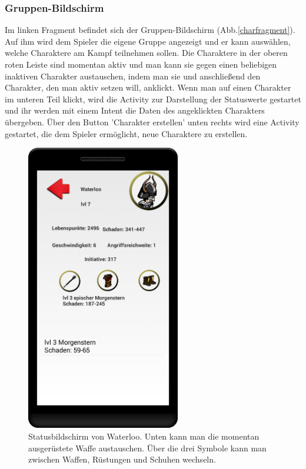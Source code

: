 \documentclass[extern,palatino]{cgBA}
\begin{document}
\subsubsection{Gruppen-Bildschirm}
Im linken Fragment befindet sich der Gruppen-Bildschirm (Abb.\ref{charfragment}). Auf ihm wird dem Spieler die eigene Gruppe angezeigt und er kann auswählen, welche Charaktere am Kampf teilnehmen sollen. Die Charaktere in der oberen roten Leiste sind momentan aktiv und man kann sie gegen einen beliebigen inaktiven Charakter austauschen, indem man sie und anschließend den Charakter, den man aktiv setzen will, anklickt.
Wenn man auf einen Charakter im unteren Teil klickt, wird die Activity zur Darstellung der Statuswerte gestartet und ihr werden mit einem Intent die Daten des angeklickten Charakters übergeben. Über den Button 'Charakter erstellen' unten rechts wird eine Activity gestartet, die dem Spieler ermöglicht, neue Charaktere zu erstellen.
\newpage
\begin{figure}[H] 
		\centering
		\includegraphics[width=0.6\textwidth]{statscreen.png}
		\caption{Statusbildschirm von Waterloo. Unten kann man die momentan ausgerüstete Waffe austauschen. Über die drei Symbole kann man zwischen Waffen, Rüstungen und Schuhen wechseln.}
		\label{statscreen}
\end{figure} 
\end{document}
